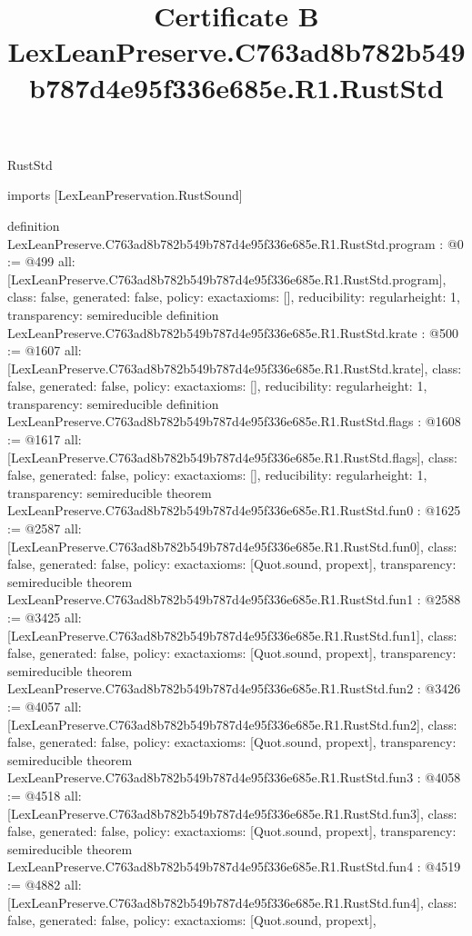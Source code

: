 \begin{lexlean}{RustStd}
\title{Certificate B LexLeanPreserve.C763ad8b782b549b787d4e95f336e685e.R1.RustStd}
\begin{coremodule}
imports [LexLeanPreservation.RustSound]

definition LexLeanPreserve.C763ad8b782b549b787d4e95f336e685e.R1.RustStd.program : @0 := @499 {
  all: [LexLeanPreserve.C763ad8b782b549b787d4e95f336e685e.R1.RustStd.program],
  class: false,
  generated: false,
  policy: exact{axioms: []},
  reducibility: regular{height: 1},
  transparency: semireducible
}
definition LexLeanPreserve.C763ad8b782b549b787d4e95f336e685e.R1.RustStd.krate : @500 := @1607 {
  all: [LexLeanPreserve.C763ad8b782b549b787d4e95f336e685e.R1.RustStd.krate],
  class: false,
  generated: false,
  policy: exact{axioms: []},
  reducibility: regular{height: 1},
  transparency: semireducible
}
definition LexLeanPreserve.C763ad8b782b549b787d4e95f336e685e.R1.RustStd.flags : @1608 := @1617 {
  all: [LexLeanPreserve.C763ad8b782b549b787d4e95f336e685e.R1.RustStd.flags],
  class: false,
  generated: false,
  policy: exact{axioms: []},
  reducibility: regular{height: 1},
  transparency: semireducible
}
theorem LexLeanPreserve.C763ad8b782b549b787d4e95f336e685e.R1.RustStd.fun0 : @1625 := @2587 {
  all: [LexLeanPreserve.C763ad8b782b549b787d4e95f336e685e.R1.RustStd.fun0],
  class: false,
  generated: false,
  policy: exact{axioms: [Quot.sound, propext]},
  transparency: semireducible
}
theorem LexLeanPreserve.C763ad8b782b549b787d4e95f336e685e.R1.RustStd.fun1 : @2588 := @3425 {
  all: [LexLeanPreserve.C763ad8b782b549b787d4e95f336e685e.R1.RustStd.fun1],
  class: false,
  generated: false,
  policy: exact{axioms: [Quot.sound, propext]},
  transparency: semireducible
}
theorem LexLeanPreserve.C763ad8b782b549b787d4e95f336e685e.R1.RustStd.fun2 : @3426 := @4057 {
  all: [LexLeanPreserve.C763ad8b782b549b787d4e95f336e685e.R1.RustStd.fun2],
  class: false,
  generated: false,
  policy: exact{axioms: [Quot.sound, propext]},
  transparency: semireducible
}
theorem LexLeanPreserve.C763ad8b782b549b787d4e95f336e685e.R1.RustStd.fun3 : @4058 := @4518 {
  all: [LexLeanPreserve.C763ad8b782b549b787d4e95f336e685e.R1.RustStd.fun3],
  class: false,
  generated: false,
  policy: exact{axioms: [Quot.sound, propext]},
  transparency: semireducible
}
theorem LexLeanPreserve.C763ad8b782b549b787d4e95f336e685e.R1.RustStd.fun4 : @4519 := @4882 {
  all: [LexLeanPreserve.C763ad8b782b549b787d4e95f336e685e.R1.RustStd.fun4],
  class: false,
  generated: false,
  policy: exact{axioms: [Quot.sound, propext]},
}
\end{coremodule}
\end{lexlean}
